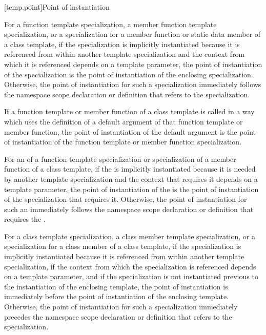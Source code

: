 [temp.point]{Point of instantiation}

\pnum
{}%
For a function template specialization, a member function template
specialization, or a specialization for a member function or static data member
of a class template,
if the specialization is implicitly instantiated because it is referenced
from within another template specialization and
the context from which it is referenced depends on a template parameter,
the point of instantiation of the specialization is the point of instantiation
of the enclosing specialization.
Otherwise, the point of instantiation for such a specialization immediately
follows the namespace scope declaration
or definition that refers to the specialization.

\pnum
If a function template or member function of a class template is called
in a way which uses the definition of a default argument of that function
template or member function,
the point of instantiation of the default argument is the point of
instantiation of the function template or member function specialization.

\pnum
For an  of a function template
specialization or specialization of a member function of a class template, if
the  is implicitly instantiated because
it is needed by another template specialization and the context that requires
it depends on a template parameter, the point of instantiation of the
 is the point of instantiation of the
specialization that requires it. Otherwise, the point of instantiation for such
an  immediately follows the namespace
scope declaration or definition that requires the
.



\pnum
For a class template specialization, a class member template specialization,
or a specialization for a class member of a class template,
if the specialization is implicitly instantiated because it is referenced
from within another template specialization,
if the context from which the specialization is referenced depends on a
template parameter,
and if the specialization is not instantiated previous to the instantiation of
the enclosing template,
the point of instantiation is immediately before the point of instantiation of
the enclosing template.
Otherwise, the point of instantiation for such a specialization immediately
precedes the namespace scope declaration
or definition that refers to the specialization.

